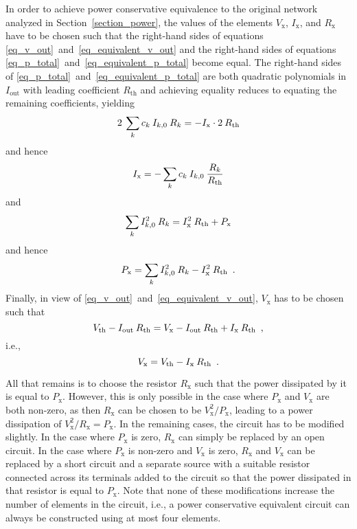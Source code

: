 \documentclass[twoside]{IEEEtran}
\newcommand{\mult}{\nonscript\:}
\newcommand{\opout}{{\operatorname{out}}}
\newcommand{\opth}{{\operatorname{th}}}
\newcommand{\opx}{{\operatorname{x}}}
\begin{document}
In order to achieve power conservative equivalence to the original network analyzed in Section~\ref{section_power}, the values of the elements $V_{\opx}$, $I_{\opx}$, and $R_{\opx}$ have to be chosen such that the right-hand sides of equations \eqref{eq_v_out}~and~\eqref{eq_equivalent_v_out} and the right-hand sides of equations \eqref{eq_p_total}~and~\eqref{eq_equivalent_p_total} become equal.
The right-hand sides of \eqref{eq_p_total}~and~\eqref{eq_equivalent_p_total} are both quadratic polynomials in $I_{\opout}$ with leading coefficient $R_{\opth}$ and achieving equality reduces to equating the remaining coefficients, yielding
\begin{displaymath}
    2 \mult \sum_{k} c_{k} \mult I_{k, 0} \mult R_{k}
  = -I_{\opx} \cdot 2 \mult R_{\opth}
\end{displaymath}
and hence
\begin{equation}
    I_{\opx}
  = -\sum_{k} c_{k} \mult I_{k, 0} \mult \frac{R_{k}}{R_{\opth}}
  \label{eq_i_x}
\end{equation}
and
\begin{displaymath}
    \sum_{k} I_{k, 0}^{2} \mult R_{k}
  = I_{\opx}^{2} \mult R_{\opth} + P_{\opx}
\end{displaymath}
and hence
\begin{equation}
    P_{\opx}
  = \sum_{k} I_{k, 0}^{2} \mult R_{k} - I_{\opx}^{2} \mult R_{\opth}
  \enskip .
  \label{eq_p_x}
\end{equation}
Finally, in view of \eqref{eq_v_out}~and~\eqref{eq_equivalent_v_out}, $V_{\opx}$ has to be chosen such that
\begin{displaymath}
    V_{\opth} - I_{\opout} \mult R_{\opth}
  = V_{\opx} - I_{\opout} \mult R_{\opth} + I_{\opx} \mult R_{\opth}
  \enskip ,
\end{displaymath}
i.e.,
\begin{equation}
    V_{\opx}
  = V_{\opth} - I_{\opx} \mult R_{\opth}
  \enskip .
  \label{eq_v_x}
\end{equation}

All that remains is to choose the resistor $R_{\opx}$ such that the power dissipated by it is equal to $P_{\opx}$.
However, this is only possible in the case where $P_{\opx}$ and $V_{\opx}$ are both non-zero, as then $R_{\opx}$ can be chosen to be $V_{\opx}^{2} / P_{\opx}$, leading to a power dissipation of $V_{\opx}^{2} / R_{\opx} = P_{\opx}$.
In the remaining cases, the circuit has to be modified slightly.
In the case where $P_{\opx}$ is zero, $R_{\opx}$ can simply be replaced by an open circuit.
In the case where $P_{\opx}$ is non-zero and $V_{\opx}$ is zero, $R_{\opx}$ and $V_{\opx}$ can be replaced by a short circuit and a separate source with a suitable resistor connected across its terminals added to the circuit so that the power dissipated in that resistor is equal to $P_{\opx}$.
Note that none of these modifications increase the number of elements in the circuit, i.e., a power conservative equivalent circuit can always be constructed using at most four elements.


\end{document}
